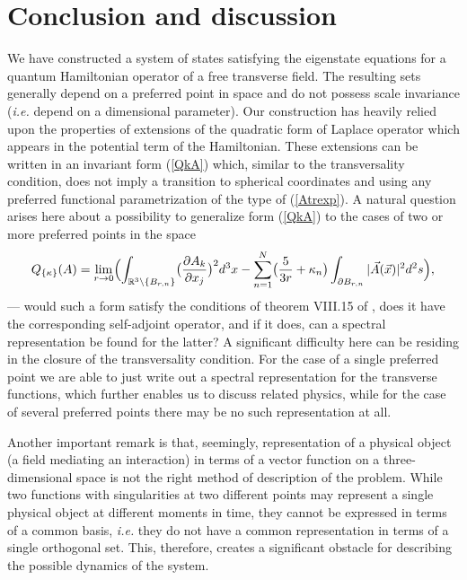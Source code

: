\documentclass[12pt]{article}
\newcommand{\RR}{\mathbb{R}}
\begin{document}
\section{Conclusion and discussion}
	We have constructed a system of states 
	satisfying the eigenstate equations for a quantum Hamiltonian operator
	of a free transverse field.
	The resulting sets generally depend on a preferred point in space and
	do not possess scale invariance ({\it i.e.} depend on a dimensional parameter).
	Our construction has heavily relied upon the properties of extensions
	of the quadratic form of Laplace operator which appears in the potential term
	of the Hamiltonian.
	These extensions can be written in an invariant form
(\ref{QkA})
	which, similar to the transversality condition, does not imply a transition
	to spherical coordinates and using any preferred functional parametrization
        of the type of
(\ref{Atrexp}).
	A natural question arises here about a possibility to generalize form
(\ref{QkA})
	to the cases of two or more preferred points in the space
\begin{equation*}
        Q_{\{\kappa\}}(A) = \lim_{r\to 0}\Bigl(
    \int_{\RR^{3}\setminus \{B_{r,n}\}}
        \bigl(\frac{\partial A_{k}}{\partial x_{j}}\bigr)^{2} d^{3} x -
    \sum_{n=1}^{N}\bigl(\frac{5}{3r}	+ \kappa_{n}\bigr)
	\int_{\partial B_{r,n}} |\vec{A}(\vec{x})|^{2} d^{2} s \Bigr) ,
\end{equation*}
	--- would such a form satisfy the conditions of theorem VIII.15 of
\cite{RS1},
	does it have the corresponding self-adjoint operator, and if it does,
	can a spectral representation be found for the latter?
	A significant difficulty here can be residing in the closure of the
	transversality condition.
	For the case of a single preferred point we are able to just
	write out a spectral representation for the transverse functions,
	which further enables us to discuss related physics,
	while for the case of several preferred points there may be no
	such representation at all.

	Another important remark is that, seemingly, representation
	of a physical object (a field mediating an interaction) in terms of a vector function
	on a three-dimensional space is not the right method of description of the problem.
	While two functions with singularities at two different points may represent
	a single physical object at different moments in time, they
	cannot be expressed in terms of a common basis,
	{\it i.e.} they do not have a common representation in terms of a single
	orthogonal set.
	This, therefore, creates a significant obstacle for describing the possible
	dynamics of the system.
\end{document}
